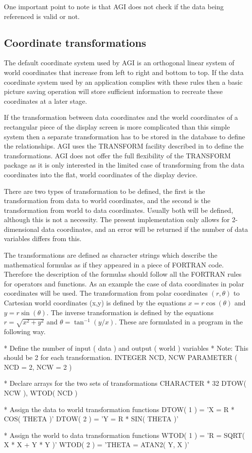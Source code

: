 \documentclass[twoside,11pt]{starlink}
\begin{document}
One important point to note is that AGI does not check if the data being
referenced is valid or not.

\subsection{Coordinate transformations}\label{tran}
The default coordinate system used by AGI is an orthogonal linear
system of world coordinates that increase from left to right and
bottom to top. If the data coordinate system used by an application
complies with these rules then a basic picture saving operation
will store sufficient information to recreate these coordinates at a
later stage.

If the transformation between data coordinates and the world coordinates
of a rectangular piece of the display screen is more complicated than
this simple system then a separate transformation has to be stored in
the database to define the relationships.
AGI uses the TRANSFORM facility described in 
to define the
transformations. AGI does not offer the full flexibility of the TRANSFORM
package as it is only interested in the limited case of transforming
from the data coordinates into the flat, world coordinates of the display
device.

There are two types of transformation to be defined, the first is the
transformation from data to world coordinates, and the second is the
transformation from world to data coordinates. Usually both will be
defined, although this is not a necessity.
The present implementation only allows for 2-dimensional data
coordinates, and an error will be returned if the number of data
variables differs from this.

The transformations are defined as character strings which describe the
mathematical formulas as if they appeared in a piece of FORTRAN code.
Therefore the description of the formulas should follow all the FORTRAN
rules for operators and functions. As an example the case of data
coordinates in polar coordinates will be used. The transformation
from polar coordinates $(r,\theta)$ to Cartesian world coordinates (x,y)
is defined by the equations
$x = r \cos( \theta )$ and $y = r \sin( \theta )$.
The inverse transformation is defined by the equations
$r = \sqrt{x^2+y^2}$ and $\theta = \tan^{-1}(y/x)$.
These are formulated in a program in the following way.
\begin{terminalv}
    *   Define the number of input ( data ) and output ( world ) variables
    *   Note: This should be 2 for each transformation.
          INTEGER NCD, NCW
          PARAMETER ( NCD = 2, NCW = 2 )

    *   Declare arrays for the two sets of transformations
          CHARACTER * 32 DTOW( NCW ), WTOD( NCD )

    *   Assign the data to world transformation functions
          DTOW( 1 ) = 'X = R * COS( THETA )'
          DTOW( 2 ) = 'Y = R * SIN( THETA )'

    *   Assign the world to data transformation functions
          WTOD( 1 ) = 'R = SQRT( X * X + Y * Y )'
          WTOD( 2 ) = 'THETA = ATAN2( Y, X )'
\end{terminalv}
\end{document}
